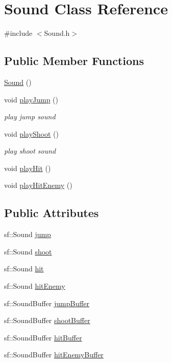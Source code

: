 \hypertarget{class_sound}{}\section{Sound Class Reference}
\label{class_sound}


{\ttfamily \#include $<$Sound.\+h$>$}

\subsection*{Public Member Functions}
\begin{DoxyCompactItemize}
\item 
\hyperlink{class_sound_a539c205cdf06fe2c621fd77c37bcfac9}{Sound} ()
\item 
void \hyperlink{class_sound_a696d9a188670c54d240fce5c43ced879}{play\+Jump} ()
\begin{DoxyCompactList}\small\item\em play jump sound \end{DoxyCompactList}\item 
void \hyperlink{class_sound_a4cb3a0ff7fb89b3267cc1d0e7abec829}{play\+Shoot} ()
\begin{DoxyCompactList}\small\item\em play shoot sound \end{DoxyCompactList}\item 
void \hyperlink{class_sound_a8745b80c3bdd62893f74383cb939ca6e}{play\+Hit} ()
\item 
void \hyperlink{class_sound_a56de021d1ec151a13e4e9f8b583eef24}{play\+Hit\+Enemy} ()
\end{DoxyCompactItemize}
\subsection*{Public Attributes}
\begin{DoxyCompactItemize}
\item 
sf\+::\+Sound \hyperlink{class_sound_a49188be0a133d32388a600764aee8959}{jump}
\item 
sf\+::\+Sound \hyperlink{class_sound_abe6dfe8e86c4fa694b0d5ce693213f2f}{shoot}
\item 
sf\+::\+Sound \hyperlink{class_sound_a8fdfa5eda5eff47c878e245c816cf4d9}{hit}
\item 
sf\+::\+Sound \hyperlink{class_sound_aca883eb04a7aa8844095afd7d397976a}{hit\+Enemy}
\item 
sf\+::\+Sound\+Buffer \hyperlink{class_sound_afb04ee141c3765d1cd14fef2268029f3}{jump\+Buffer}
\item 
sf\+::\+Sound\+Buffer \hyperlink{class_sound_a963c0081728c14318b99dc8618a950c6}{shoot\+Buffer}
\item 
sf\+::\+Sound\+Buffer \hyperlink{class_sound_ad68e36ce916f5b858aaf467a6fd929e1}{hit\+Buffer}
\item 
sf\+::\+Sound\+Buffer \hyperlink{class_sound_a5a2a2ccabe0099ebf4c8fc3cbb8edff6}{hit\+Enemy\+Buffer}
\end{DoxyCompactItemize}


